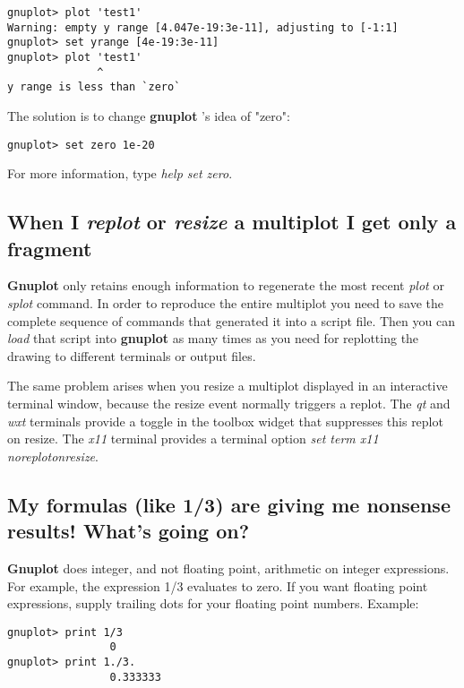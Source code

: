 \documentclass[a4paper,11pt]{article}
\newcommand{\gnuplot}{\textbf{gnuplot }}
\newcommand{\Gnuplot}{\textbf{Gnuplot }}
\begin{document}
\small
\begin{verbatim}
gnuplot> plot 'test1'
Warning: empty y range [4.047e-19:3e-11], adjusting to [-1:1]
gnuplot> set yrange [4e-19:3e-11]
gnuplot> plot 'test1'
              ^
y range is less than `zero`
\end{verbatim}
\normalsize

The solution is to change \gnuplot's idea of "zero":
\small
\begin{verbatim}
gnuplot> set zero 1e-20
\end{verbatim}
\normalsize

For more information, type {\em help set zero}.

\subsection{When I {\em replot} or {\em resize} a multiplot I get only a fragment}

\Gnuplot only retains enough information to regenerate the most recent
{\em plot} or {\em splot} command.
In order to reproduce the entire multiplot you need to save the complete
sequence of commands that generated it into a script file.
Then you can {\em load} that script into \gnuplot as many times as you need
for replotting the drawing to different terminals or output files.

The same problem arises when you resize a multiplot displayed in an interactive
terminal window, because the resize event normally triggers a replot.
The {\em qt} and {\em wxt} terminals provide a toggle in the toolbox widget
that suppresses this replot on resize.  The {\em x11} terminal provides a 
terminal option {\em set term x11 noreplotonresize}.

\subsection{My formulas (like 1/3) are giving me nonsense results! What's going on?}

\Gnuplot{} does integer, and not floating point, arithmetic on
integer expressions. For example, the expression 1/3 evaluates
to zero. If you want floating point expressions, supply
trailing dots for your floating point numbers. Example:


\small
\begin{verbatim}
gnuplot> print 1/3
                0
gnuplot> print 1./3.
                0.333333
\end{verbatim}
\normalsize
\end{document}
